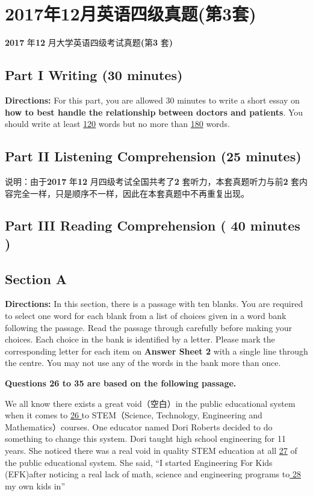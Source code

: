 \documentclass[UTF8,11pt]{ctexart}
\begin{document}
\section*{2017年12月英语四级真题(第3套)}
\textbf{2017} 年\textbf{12} 月大学英语四级考试真题\textbf{(}第\textbf{3} 套\textbf{)}


\subsection*{\textbf{Part I} \textbf{Writing} \textbf{(30 minutes)}}


\textbf{Directions:} For this part, you are allowed 30 minutes to write a short essay on\textbf{ how to best handle the relationship} \textbf{between doctors and patients}. You should write at least \uline{120} words but no more than \uline{180} words.


\subsection*{\textbf{Part II} \textbf{Listening Comprehension} \textbf{(25 minutes)}}


说明：由于\textbf{2017} 年\textbf{12} 月四级考试全国共考了\textbf{2} 套听力，本套真题听力与前\textbf{2} 套内容完全一样，只是顺序不一样，因此在本套真题中不再重复出现。


\subsection*{\textbf{Part} III \textbf{Reading Comprehension} \textbf{( 40 minutes )}}


\subsection*{\textbf{Section A}}


\textbf{Directions:} In this section, there is a passage with ten blanks. You are required to select one word for each blank from a list of choices given in a word bank following the passage. Read the passage through carefully before making your choices. Each choice in the bank is identified by a letter. Please mark the corresponding letter for each item on\textbf{ Answer Sheet 2} with a single line through the centre. You may not use any of the words in the bank more than once.


\textbf{Questions 26 to 35 are based on the following passage.}


We all know there exists a great void（空白）in the public educational system when it comes to \uline{26 }to STEM（Science, Technology, Engineering and Mathematics）courses. One educator named Dori Roberts decided to do something to change this system. Dori taught high school engineering for 11 years. She noticed there was a real void in quality STEM education at all \uline{27} of the public educational system. She said, “I started Engineering For Kids (EFK)after noticing a real lack of math, science and engineering programs to\uline{ 28 }my own kids in”
\end{document}
